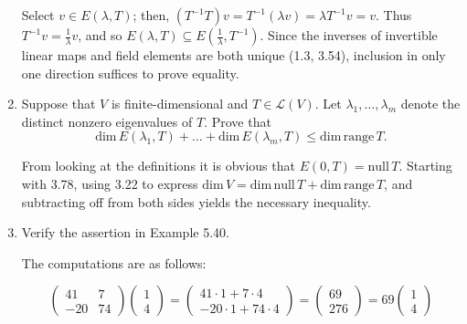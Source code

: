\documentclass{book}
\begin{document}
\begin{enumerate}
Select \(v \in E(\lambda,T)\); then, \((T^{-1}T)v=T^{-1}(\lambda v)=\lambda T^{-1}v = v\).  Thus \(T^{-1}v=\frac{1}{\lambda}v\), and so \(E(\lambda,T) \subseteq E(\frac{1}{\lambda},T^{-1})\).  Since the inverses of invertible linear maps and field elements are both unique (1.3, 3.54), inclusion in only one direction suffices to prove equality.  

\item Suppose that \(V\) is finite-dimensional and \(T \in \mathcal{L}(V)\).  Let \(\lambda_1,\dots,\lambda_m\) denote the distinct nonzero eigenvalues of \(T\).  Prove that \[\textrm{dim} \, E(\lambda_1,T)+\dots+\textrm{dim} \, E(\lambda_m,T) \leq \textrm{dim} \, \textrm{range} \, T.\]

From looking at the definitions it is obvious that \(E(0,T)=\text{null} \, T\).  Starting with 3.78, using 3.22 to express \(\text{dim} \, V = \text{dim} \, \text{null} \, T + \text{dim} \, \text{range} \, T\), and subtracting off from both sides yields the necessary inequality.

\item Verify the assertion in Example 5.40.

The computations are as follows:

\begin{equation*}
    \begin{pmatrix}
        41 & 7 \\
        -20 & 74
    \end{pmatrix}
    \begin{pmatrix}
        1 \\
        4
    \end{pmatrix}
    =
    \begin{pmatrix}
        41 \cdot 1 + 7 \cdot 4 \\
        -20 \cdot 1 + 74 \cdot 4
    \end{pmatrix}
    =
    \begin{pmatrix}
        69 \\
        276
    \end{pmatrix}
    =69
    \begin{pmatrix}
        1 \\
        4
    \end{pmatrix}    
\end{equation*}


\end{enumerate}
\end{document}
